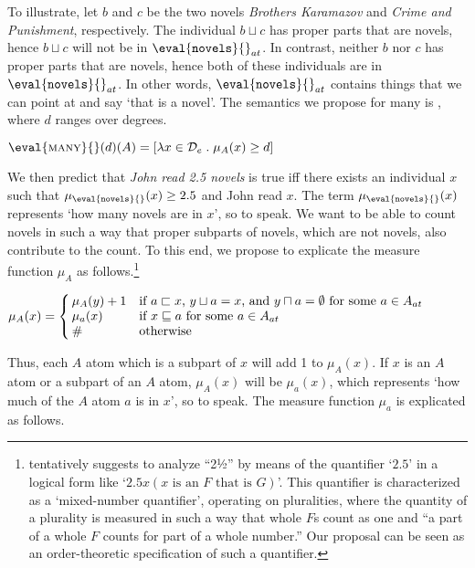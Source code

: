\documentclass[output=paper]{langscibook}
\begin{document}
\noindent To illustrate, let $b$ and $c$ be the two novels \textit{Brothers Karamazov} and \textit{Crime and Punishment}, respectively. The individual $b \sqcup c$ has proper parts that are novels, hence $b \sqcup c$ will not be in $\eval{\texttt{novels}}{}_{at}$. In contrast, neither $b$ nor $c$ has proper parts that are novels, hence both of these individuals are in $\eval{\texttt{novels}}{}_{at}$. In other words, $\eval{\texttt{novels}}{}_{at}$ contains things that we can point at and say `that is a novel'. The semantics we propose for {\sc many} is , where $d$ ranges over degrees.

\ea 
$\eval{\mbox{\sc many}}{}(d)(A) = [\lambda x\in{\mathcal D}_e\;.\;\mu_A(x) \ge d]$  
\label{hai-tri:many}
\z

\noindent We then predict that \textit{John read 2.5 novels} is true iff there exists an individual $x$ such that $\mu_{\eval{\texttt{novels}}{}}(x) \ge 2.5$ and John read $x$. The term $\mu_{\eval{\texttt{novels}}{}}(x)$ represents `how many novels are in $x$', so to speak. We want to be able to count novels in such a way that proper subparts of novels, which are not novels, also contribute to the count. To this end, we propose to explicate the measure function $\mu_A$ as follows.\footnote{\citet{salmon1997} tentatively suggests to analyze ``2½'' by means of the quantifier `$2.5$' in a logical form like `$2.5x(\mbox{$x$ is an $F$ that is $G$})$'. This quantifier is characterized as a `mixed-number quantifier', operating on pluralities, where the quantity of a plurality is measured in such a way that whole $F$s count as one and ``a part of a whole $F$ counts for part of a whole number.'' Our proposal can be seen as an order-theoretic specification of such a quantifier.}

\ea \label{hai-tri:mu-A}
$\mu_A(x)=
\left\{\begin{array}{@{\,}ll@{}}
\mu_A(y)+1 & \mbox{if $a\sqsubset x$, $y\sqcup a=x$, and $y\sqcap a=\emptyset$ for some $a \in A_{at}$}\\
\mu_a(x)   & \mbox{if $x\sqsubseteq a$ for some $a \in A_{at}$}\\
\#  & \mbox{otherwise}
\end{array}\right.$
\z

\noindent Thus, each $A$ atom which is a subpart of $x$ will add 1 to $\mu_A(x)$. If $x$ is an $A$ atom or a subpart of an $A$ atom, $\mu_A(x)$ will be $\mu_a(x)$, which represents `how much of the $A$ atom $a$ is in $x$', so to speak. The measure function $\mu_a$ is explicated as follows.
     
\end{document}
